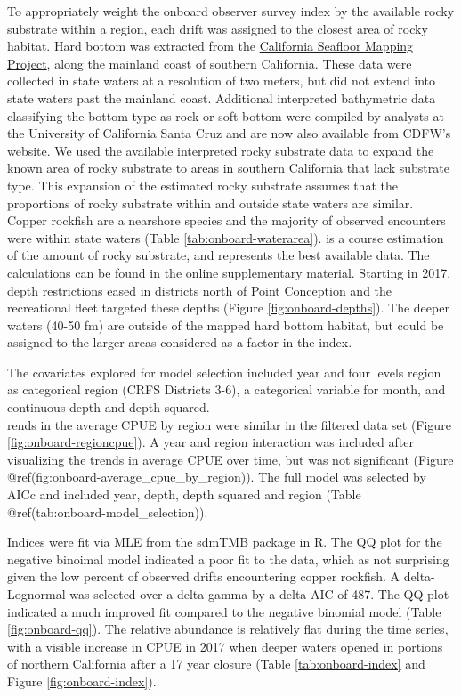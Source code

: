 \documentclass[11pt,
  english,
  letterpaper,
]{article}
\begin{document}
To appropriately weight the onboard observer survey index by the available rocky substrate within a region, each drift was assigned to the closest area of rocky habitat. Hard bottom was extracted from the \href{http://seafloor.otterlabs.org/index.html}{California Seafloor Mapping Project}, along the mainland coast of southern California. These data were collected in state waters at a resolution of two meters, but did not extend into state waters past the mainland coast. Additional interpreted bathymetric data classifying the bottom type as rock or soft bottom were compiled by analysts at the University of California Santa Cruz and are now also available from CDFW's website. We used the available interpreted rocky substrate data to expand the known area of rocky substrate to areas in southern California that lack substrate type. This expansion of the estimated rocky substrate assumes that the proportions of rocky substrate within and outside state waters are similar. Copper rockfish are a nearshore species and the majority of observed encounters were within state waters (Table \ref{tab:onboard-waterarea}). is a course estimation of the amount of rocky substrate, and represents the best available data. The calculations can be found in the online supplementary material. Starting in 2017, depth restrictions eased in districts north of Point Conception and the recreational fleet targeted these depths (Figure \ref{fig:onboard-depths}). The deeper waters (40-50 fm) are outside of the mapped hard bottom habitat, but could be assigned to the larger areas considered as a factor in the index.

The covariates explored for model selection included year and four levels region as categorical region (CRFS Districts 3-6), a categorical variable for month, and continuous depth and depth-squared.\\
rends in the average CPUE by region were similar in the filtered data set (Figure \ref{fig:onboard-regioncpue}). A year and region interaction was included after visualizing the trends in average CPUE over time, but was not significant (Figure @ref(fig:onboard-average\_cpue\_by\_region)). The full model was selected by AICc and included year, depth, depth squared and region (Table @ref(tab:onboard-model\_selection)).

Indices were fit via MLE from the sdmTMB package in R. The QQ plot for the negative binoimal model indicated a poor fit to the data, which as not surprising given the low percent of observed drifts encountering copper rockfish. A delta-Lognormal was selected over a delta-gamma by a delta AIC of 487. The QQ plot indicated a much improved fit compared to the negative binomial model (Table \ref{fig:onboard-qq}). The relative abundance is relatively flat during the time series, with a visible increase in CPUE in 2017 when deeper waters opened in portions of northern California after a 17 year closure (Table \ref{tab:onboard-index} and Figure \ref{fig:onboard-index}).
\end{document}

